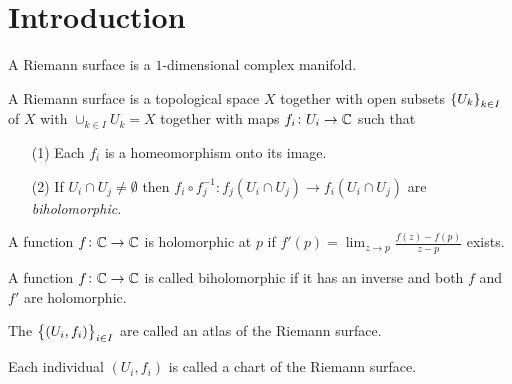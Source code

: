 \documentclass[11pt,a4paper]{article}
\begin{document}
\maketitle


\newpage
\tableofcontents
\newpage

\section{Introduction}
\begin{definition}
    A Riemann surface is a $1$-dimensional complex manifold.
\end{definition}

\begin{definition}
    A Riemann surface is a topological space $X$ together with
    open subsets $\set{U_k}_{k \in I}$ of $X$ with
    $\cup_{k \in I} U_k = X$ together with maps $f_i \colon U_i \to \mathbb{C}$
    such that
    \begin{enumerate}
        \item[(1)] Each $f_i$ is a homeomorphism onto its image.
        \item[(2)] If $U_i \cap U_j \neq \emptyset$ then 
            $f_i \circ f_j^{-1} \colon 
            f_j(U_i \cap U_j) \to f_i(U_i \cap U_j)$ are \emph{biholomorphic}.
    \end{enumerate}
\end{definition}

\begin{remark}
    A function $f \colon \mathbb{C} \to \mathbb{C}$ is holomorphic at $p$ if 
    $f'(p) = \lim_{z \to p} \frac{f(z) - f(p)}{z - p}$ exists.
\end{remark}

\begin{definition}[Biholomorphism]
    A function $f \colon \mathbb{C} \to \mathbb{C}$ is called biholomorphic if it has an inverse
    and both $f$ and $f'$ are holomorphic.
\end{definition}

\begin{definition}[Atlas]
    The $\set{(U_i, f_i)}_{i \in I}$ are called an atlas of the Riemann surface.
\end{definition}

\begin{definition}[Chart]
    Each individual $(U_i, f_i)$ is called a chart of the Riemann surface.
\end{definition}
\end{document}
